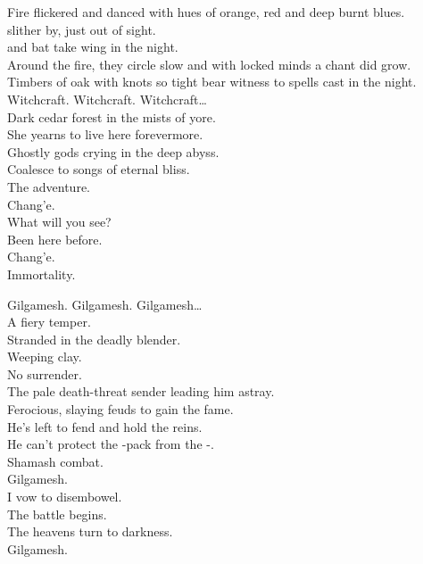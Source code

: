 
Fire flickered and danced with hues of orange, red and deep burnt blues. \\
 slither by, just out of sight. \\
 and bat take wing in the night. \\
Around the fire, they circle slow and with locked minds a chant did grow. \\
Timbers of oak with knots so tight bear witness to spells cast in the night. \\

Witchcraft. Witchcraft. Witchcraft… \\

Dark cedar forest in the mists of yore. \\
She yearns to live here forevermore. \\
Ghostly gods crying in the deep abyss. \\
Coalesce to songs of eternal bliss. \\

The adventure. \\
Chang'e. \\
What will you see? \\
Been here before. \\
Chang'e. \\
Immortality. \\



Gilgamesh. Gilgamesh. Gilgamesh… \\

A fiery temper. \\
Stranded in the deadly blender. \\
Weeping  clay. \\
No surrender. \\
The pale death-threat sender leading him astray. \\
Ferocious, slaying feuds to gain the fame. \\
He's left to fend and hold the reins. \\
He can't protect the -pack from the -. \\
Shamash combat. \\

Gilgamesh. \\
I vow to disembowel. \\
The battle begins. \\
The heavens turn to darkness. \\
Gilgamesh. \\


